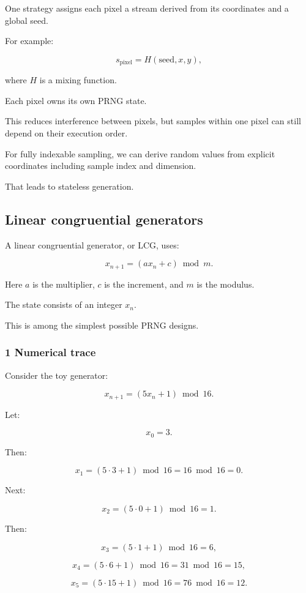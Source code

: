 One strategy assigns each pixel a stream derived from its coordinates and a global seed.

For example:

\[
 s_{\mathrm{pixel}}= H(\text{seed},x,y),
\]

where \(H\) is a mixing function.

Each pixel owns its own PRNG state.

This reduces interference between pixels, but samples within one pixel can still depend on their execution order.

For fully indexable sampling, we can derive random values from explicit coordinates including sample index and dimension.

That leads to stateless generation.

\subsection{Linear congruential generators}\label{02-foundations-ii-ch029-linear-congruential-generators}

A linear congruential generator, or LCG, uses:

\[
 \boxed{ x_{n+1}=(ax_n+c)\bmod m }.
\]

Here \(a\) is the multiplier, \(c\) is the increment, and \(m\) is the modulus.

The state consists of an integer \(x_n\).

This is among the simplest possible PRNG designs.

\subsubsection{1 Numerical trace}\label{02-foundations-ii-ch029-numerical-trace}

Consider the toy generator:

\[
 x_{n+1}=(5x_n+1)\bmod16.
\]

Let:

\[
 x_0=3.
\]

Then:

\[
 x_1=(5\cdot3+1)\bmod16=16\bmod16=0.
\]

Next:

\[
 x_2=(5\cdot0+1)\bmod16=1.
\]

Then:

\[
 x_3=(5\cdot1+1)\bmod16=6,
\]

\[
 x_4=(5\cdot6+1)\bmod16=31\bmod16=15,
\]

\[
 x_5=(5\cdot15+1)\bmod16=76\bmod16=12.
\]

